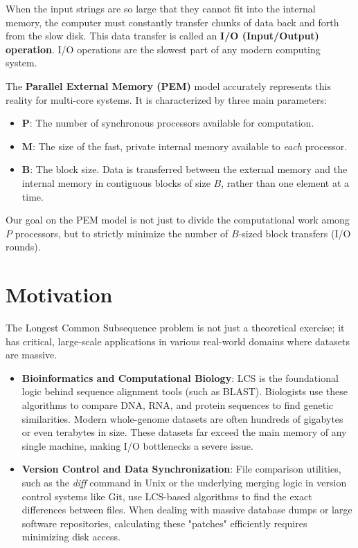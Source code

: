 When the input strings are so large that they cannot fit into the internal memory, the computer must constantly transfer chunks of data back and forth from the slow disk. This data transfer is called an \textbf{I/O (Input/Output) operation}. I/O operations are the slowest part of any modern computing system.

The \textbf{Parallel External Memory (PEM)} model accurately represents this reality for multi-core systems\cite{sajith-spem-23}. It is characterized by three main parameters:
\begin{itemize}
    \item $\mathbf{P}$: The number of synchronous processors available for computation.
    \item $\mathbf{M}$: The size of the fast, private internal memory available to \textit{each} processor.
    \item $\mathbf{B}$: The block size. Data is transferred between the external memory and the internal memory in contiguous blocks of size $B$, rather than one element at a time.
\end{itemize}
Our goal on the PEM model is not just to divide the computational work among $P$ processors, but to strictly minimize the number of $B$-sized block transfers (I/O rounds).

\section{Motivation}
The Longest Common Subsequence problem is not just a theoretical exercise; it has critical, large-scale applications in various real-world domains where datasets are massive.

\begin{itemize}
    \item \textbf{Bioinformatics and Computational Biology}: LCS is the foundational logic behind sequence alignment tools (such as BLAST). Biologists use these algorithms to compare DNA, RNA, and protein sequences to find genetic similarities. Modern whole-genome datasets are often hundreds of gigabytes or even terabytes in size. These datasets far exceed the main memory of any single machine, making I/O bottlenecks a severe issue.
    \item \textbf{Version Control and Data Synchronization}: File comparison utilities, such as the \textit{diff} command in Unix or the underlying merging logic in version control systems like Git, use LCS-based algorithms to find the exact differences between files. When dealing with massive database dumps or large software repositories, calculating these "patches" efficiently requires minimizing disk access.
\end{itemize}

